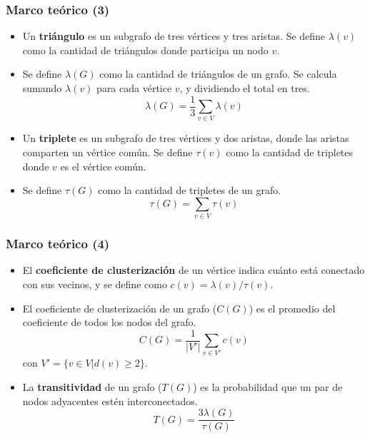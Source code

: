 \begin{frame}
\frametitle{Marco teórico (3)}

\begin{itemize}
	\item Un \textbf{triángulo} es un subgrafo de tres vértices y tres aristas. Se define $\lambda(v)$ como la cantidad de triángulos donde participa un nodo $v$.
	\item Se define $\lambda(G)$ como la cantidad de triángulos de un grafo. Se calcula sumando $\lambda(v)$ para cada vértice $v$, y dividiendo el total en tres.
	\begin{equation}
		\lambda(G) = \dfrac{1}{3} \sum_{v \in V} \lambda(v) \label{eq:triangles}
	\end{equation}
	
	\item Un \textbf{triplete} es un subgrafo de tres vértices y dos aristas, donde las aristas comparten un vértice común. Se define $\tau(v)$ como la cantidad de tripletes donde $v$ es el vértice común.
	\item Se define $\tau(G)$ como la cantidad de tripletes de un grafo.
	\begin{equation}
		\tau(G) = \sum_{v \in V} \tau(v) \label{eq:triplets}
	\end{equation}
\end{itemize}

\end{frame}

\begin{frame}
\frametitle{Marco teórico (4)}

\begin{itemize}
	\item El \textbf{coeficiente de clusterización} de un vértice indica cuánto está conectado con sus vecinos, y se define como $c(v) =  \lambda(v) / \tau(v)$. 
	\item El coeficiente de clusterización de un grafo ($C(G)$) es el promedio del coeficiente de todos los nodos del grafo.
	\begin{equation}
		C(G) = \dfrac{1}{|V'|} \sum_{v \in V'} c(v)\label{eq:CC}
	\end{equation}
	con $V' = \{ v \in V | d(v) \geq 2 \}$.
	
	\item La \textbf{transitividad} de un grafo ($T(G)$) es la probabilidad que un par de nodos adyacentes estén interconectados.
	\begin{equation}
		T(G) = \dfrac{3 \lambda(G)}{\tau(G)} \label{eq:T} 
	\end{equation}
\end{itemize}

\end{frame}



